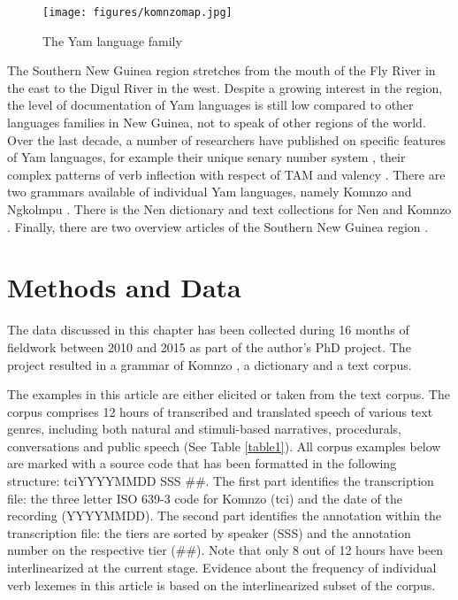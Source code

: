 \documentclass[output=paper]{langscibook}
\begin{document}
\begin{figure}
	\centering
		\texttt{[image: figures/komnzomap.jpg]}
	\caption{The Yam language family}
	\label{fig:Yam-family-2}
\end{figure}

The Southern New Guinea region stretches from the mouth of the Fly River in the east to the Digul River in the west. Despite a growing interest in the region, the level of documentation of Yam languages is still low compared to other languages families in New Guinea, not to speak of other regions of the world. Over the last decade, a number of researchers have published on specific features of Yam languages, for example their unique senary number system \citep{Donohue2008, Evans2009, Hammarstrom2009, Plank2009}, their complex patterns of verb inflection with respect of TAM \citep{Siegel2015, Evans2015Oxford} and valency \citep{Evans2015Valency, Siegel2017}. There are two grammars available of individual Yam languages, namely Komnzo \citep{Doehler2018} and Ngkolmpu \citep{Carroll2016}. There is the Nen dictionary \citep{Evans2019} and text collections for Nen \citep{Evans2010} and Komnzo \citep{Doehler2010}. Finally, there are two overview articles of the Southern New Guinea region \citep{EvansKlamer2012, EvansEtAl2017}.
\section{Methods and Data}\label{methods}
The data discussed in this chapter has been collected during 16 months of fieldwork between 2010 and 2015 as part of the author's PhD project. The project resulted in a grammar of Komnzo \citep{Doehler2018}, a dictionary and a text corpus.

The examples in this article are either elicited or taken from the text corpus. The corpus comprises 12 hours of transcribed and translated speech of various text genres, including both natural and stimuli-based narratives, procedurals, conversations and public speech (See Table \ref{table1}). All corpus examples below are marked with a source code that has been formatted in the following structure: tciYYYYMMDD SSS \#\#. The first part identifies the transcription file: the three letter ISO 639-3 code for Komnzo (tci) and the date of the recording (YYYYMMDD). The second part identifies the annotation within the transcription file: the tiers are sorted by speaker (SSS) and the annotation number on the respective tier (\#\#). Note that only 8 out of 12 hours have been interlinearized at the current stage. Evidence about the frequency of individual verb lexemes in this article is based on the interlinearized subset of the corpus.
\end{document}
